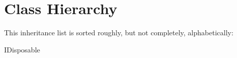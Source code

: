 \section{Class Hierarchy}
This inheritance list is sorted roughly, but not completely, alphabetically\+:\begin{DoxyCompactList}
\item I\+Disposable\begin{DoxyCompactList}
\item {}
\end{DoxyCompactList}
\end{DoxyCompactList}
